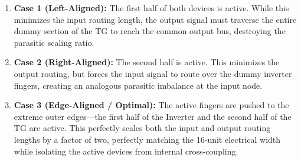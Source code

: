 \begin{enumerate}
    \item \textbf{Case 1 (Left-Aligned):} The first half of both devices is active. While this minimizes the input routing length, 
    the output signal must traverse the entire dummy section of the TG to reach the common output bus, destroying the parasitic scaling ratio.
    \item \textbf{Case 2 (Right-Aligned):} The second half is active. This minimizes the output routing, 
    but forces the input signal to route over the dummy inverter fingers, creating an analogous parasitic imbalance at the input node.
    \item \textbf{Case 3 (Edge-Aligned / Optimal):} The active fingers are pushed to the extreme outer edges—the first half of the Inverter 
    and the second half of the TG are active. This perfectly scales both the input and output routing lengths by a factor of two, perfectly 
    matching the 16-unit electrical width while isolating the active devices from internal cross-coupling.
\end{enumerate}

